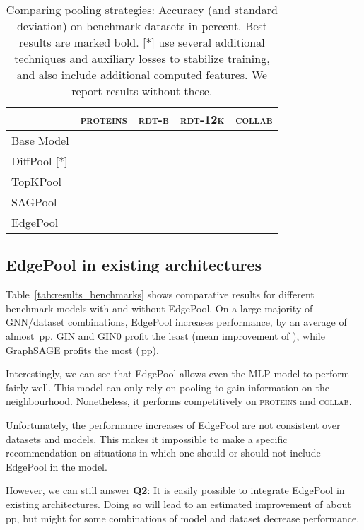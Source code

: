 \documentclass{article}
\newcommand{\tableref}[1]{Table~\ref{#1}}
\newcommand{\edgepool}{EdgePool}
\newcommand{\datasetname}[1]{\textsc{#1}}
\newcommand{\proteins}{\datasetname{proteins}}
\newcommand{\collab}{\datasetname{collab}}
\newcommand{\pp}{\,\gls{pp}}
\begin{document}
\begin{table}
	\centering
	
\caption{Comparing pooling strategies: Accuracy (and standard deviation) on benchmark datasets in percent. Best results are marked bold. [*] \citet{yingHierarchicalGraphRepresentation2018} use several additional techniques and auxiliary losses to stabilize training, and also include additional computed features. We report results without these.} 

\begin{tabular}{lrrrr}
	\toprule
	                   & \textbf{\datasetname{proteins}} & \textbf{\datasetname{rdt-b}} & \textbf{\datasetname{rdt-12k}} & \textbf{\datasetname{collab}}\\ \midrule
	Base Model         &  			&  		&  		&  \\
	DiffPool [*]       &  	        &  		&  		& \\
	TopKPool           &  			&  		&  		& \\
	SAGPool            &  			&  		&  		& \\
	\edgepool{}        &  			&  	        &  	&  \\\bottomrule
\end{tabular} 	\label{tab:results_pooling}
\end{table}

\subsection{\edgepool{} in existing architectures}

\tableref{tab:results_benchmarks} shows comparative results for different benchmark models with and without \edgepool{}. On a large majority of \gls{GNN}/dataset combinations, \edgepool{} increases performance, by an average of almost \pp{}. GIN and GIN0 profit the least (mean improvement of ), while GraphSAGE profits the most (\pp{}).

Interestingly, we can see that \edgepool{} allows even the \gls{MLP} model to perform fairly well. This model can only rely on pooling to gain information on the neighbourhood. Nonetheless, it performs competitively on \proteins{} and \collab{}.

Unfortunately, the performance increases of \edgepool{} are not consistent over datasets and models. This makes it impossible to make a specific recommendation on situations in which one should or should not include \edgepool{} in the model.

However, we can still answer \textbf{Q2}: It is easily possible to integrate \edgepool{} in existing architectures. Doing so will lead to an estimated improvement of about \pp{}, but might for some combinations of model and dataset decrease performance.
\end{document}
